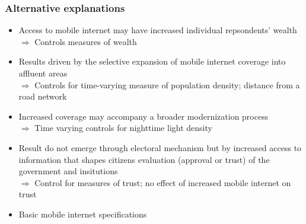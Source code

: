 \documentclass[11pt]{article}
\begin{document}
\subsubsection*{Alternative explanations}
\begin{itemize}
    \item Access to mobile internet may have increased individual repsondents' wealth
    \\
    $\Rightarrow$ Controls measures of wealth
    \item Results driven by the selective expansion of mobile internet coverage into affluent areas
    \\
    $\Rightarrow$ Controls for time-varying measure of population density; distance from a road network
    \item Increased coverage may accompany a broader modernization process
    \\
    $\Rightarrow$ Time varying controls for nighttime light density
    \item Result do not emerge through electoral mechanism but by increased access to information that shapes citizens evaluation (approval or trust) of the government and insitutions
    \\
    $\Rightarrow$ Control for measures of trust; no effect of increased mobile internet on trust
    \item Basic mobile internet specifications
\end{itemize}
\end{document}
